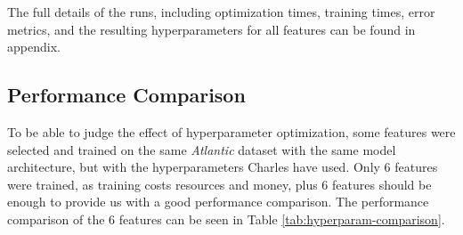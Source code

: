 \documentclass[12pt,twoside]{report}
\begin{document}
The full details of the runs, including optimization times, training times, error metrics, and the resulting hyperparameters for all features can be found in appendix.

\subsection{Performance Comparison}

To be able to judge the effect of hyperparameter optimization, some features were selected and trained on the same \textit{Atlantic} dataset with the same model architecture, but with the hyperparameters Charles have used. Only 6 features were trained, as training costs resources and money, plus 6 features should be enough to provide us with a good performance comparison. The performance comparison of the 6 features can be seen in Table \ref{tab:hyperparam-comparison}.
\end{document}
